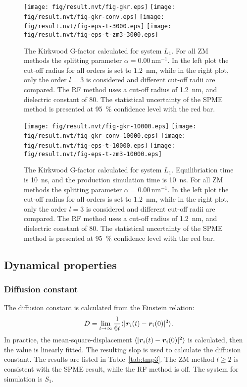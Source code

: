 \documentclass[aip,jcp,a4paper,reprint,unsortedaddress,onecolumn,fleqn]{revtex4-1}
\newcommand{\vect}[1]{\textbf{\textit{#1}}}
\newcommand{\systemsb}{S_1}
\newcommand{\systemlb}{L_1}
\begin{document}
\begin{figure}
  \centering
  \texttt{[image: fig/result.nvt/fig-gkr.eps]}
  \texttt{[image: fig/result.nvt/fig-gkr-conv.eps]}
  \texttt{[image: fig/result.nvt/fig-eps-t-3000.eps]}
  \texttt{[image: fig/result.nvt/fig-eps-t-zm3-3000.eps]}
  \caption{The Kirkwood G-factor calculated for system $\systemlb$.
    For all ZM methods the splitting parameter $\alpha = 0.00\,\textrm{nm}^{-1}$.
    In the left plot the cut-off radius for all orders is set to $1.2$~nm, while
    in the right plot, only the order $l=3$ is considered and different cut-off radii are compared.
    The RF method uses a cut-off radius of 1.2~nm, and dielectric constant of 80.
    The statistical uncertainty of the SPME method is presented at 95~\% confidence level with the red bar.
  }
  \label{fig:tmp2}
\end{figure}

\begin{figure}
  \centering
  \texttt{[image: fig/result.nvt/fig-gkr-10000.eps]}
  \texttt{[image: fig/result.nvt/fig-gkr-conv-10000.eps]}
  \texttt{[image: fig/result.nvt/fig-eps-t-10000.eps]}
  \texttt{[image: fig/result.nvt/fig-eps-t-zm3-10000.eps]}
  \caption{The Kirkwood G-factor calculated for system $\systemlb$. Equilibriation time is 10~ns, and the production simulation time is 10~ns.
    For all ZM methods the splitting parameter $\alpha = 0.00\,\textrm{nm}^{-1}$.
    In the left plot the cut-off radius for all orders is set to $1.2$~nm, while
    in the right plot, only the order $l=3$ is considered and different cut-off radii are compared.
    The RF method uses a cut-off radius of 1.2~nm, and dielectric constant of 80.
    The statistical uncertainty of the SPME method is presented at 95~\% confidence level with the red bar.
  }
  \label{fig:tmp3}
\end{figure}



\subsection{Dynamical properties}

\subsubsection{Diffusion constant}
The diffusion constant is calculated from the Einstein relation:
\begin{align}
  D = \lim_{t\rightarrow \infty}\frac {1}{6t} \langle \vert \vect r_i(t) - \vect r_i(0)\vert^2\rangle.
\end{align}
In practice, the mean-square-displacement $\langle\vert \vect r_i(t) - \vect
r_i(0)\vert^2\rangle$ is calculated, then the value is linearly fitted. The
resulting slop is used to calculate the diffusion constant. The results are listed in Table~\ref{tab:tmp3}.
The ZM method $l\geq 2$ is consistent with the SPME
result, while the RF method is off. The system for simulation is $\systemsb$.
\end{document}

